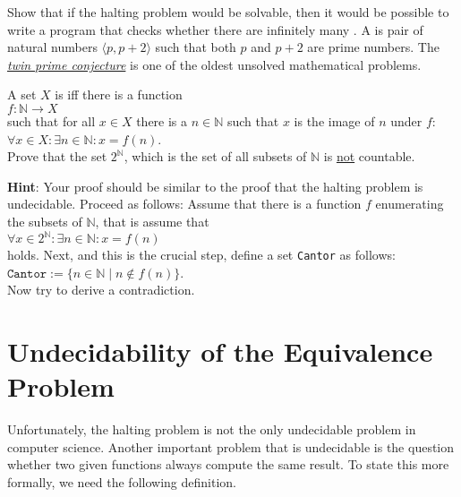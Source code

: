 \exerciseEng
Show that if the halting problem would be solvable, then it would be possible to write a program that checks
whether there are infinitely many .  A  is pair of natural numbers
$\langle p, p + 2 \rangle$ such that both $p$ and $p+2$ are prime numbers.  
The \href{http://en.wikipedia.org/wiki/Twin_prime_conjecture}{\emph{twin prime conjecture}} is one
of the oldest unsolved mathematical problems.  \eox

\exerciseEng
A set $X$ is   iff there is a function 
\\[0.2cm]
\hspace*{1.3cm}
 $f: \mathbb{N} \rightarrow X$ 
\\[0.2cm]
such that for all $x\in X$ there is a $n \in \mathbb{N}$ such that $x$ is the image of
$n$ under $f$: 
\\[0.2cm]
\hspace*{1.3cm} $\forall x \in X: \exists n \in \mathbb{N}: x = f(n)$.
\\[0.2cm]
Prove that the set $2^\mathbb{N}$, which is the set of all subsets of $\mathbb{N}$ is \underline{not} countable. 

\vspace*{0.2cm}

\noindent
\textbf{Hint}:  Your proof should be similar to the proof that the halting problem is undecidable. 
Proceed as follows:
Assume that there is a function $f$ enumerating the subsets of $\mathbb{N}$, that is assume that 
\\[0.2cm]
\hspace*{1.3cm}
$\forall x \in 2^\mathbb{N}: \exists n \in \mathbb{N}: x = f(n)$
\\[0.2cm]
holds.  Next, and this is the crucial step, define a set \texttt{Cantor} as follows:
\\[0.2cm]
\hspace*{1.3cm} $\mathtt{Cantor} := \bigl\{ n \in \mathbb{N} \mid n \notin f(n) \bigr\}$.
\\[0.2cm]
Now try to derive a contradiction.  \eox



\section[The Equivalence Problem]{Undecidability of the Equivalence Problem}
Unfortunately, the halting problem is not the only undecidable problem in computer science.  Another
important problem that is undecidable is the question whether two given functions always compute the
same result.  To state this more formally, we need the following definition.


